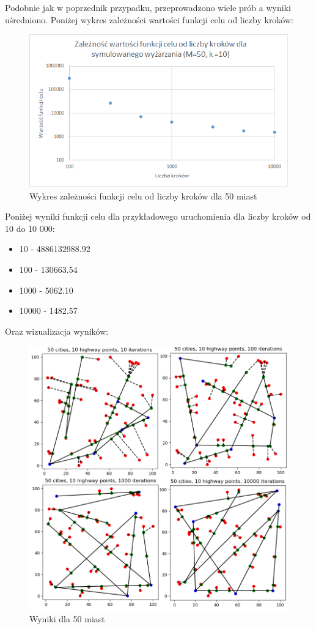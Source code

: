 \documentclass[a4paper]{article}
\begin{document}
Podobnie jak w poprzednik przypadku, przeprowadzono wiele prób a wyniki uśredniono. Poniżej wykres zależności wartości funkcji celu od liczby kroków:
\begin{figure}[h!]
\centering
\includegraphics[width=12cm]{50_cities_wykres}
\caption{Wykres zależności funkcji celu od liczby kroków dla 50 miast}
\label{fig:wyk50}
\end{figure}

Poniżej wyniki funkcji celu dla przykładowego uruchomienia dla liczby kroków od 10 do 10 000:
\begin{itemize}
\item 10 - 4886132988.92
\item 100 - 130663.54
\item 1000 - 5062.10
\item 10000 - 1482.57
\end{itemize}

Oraz wizualizacja wyników:

\begin{figure}[h!]
\centering
\includegraphics[width=12cm]{50_cities}
\caption{Wyniki dla 50 miast}
\end{figure}
\end{document}
